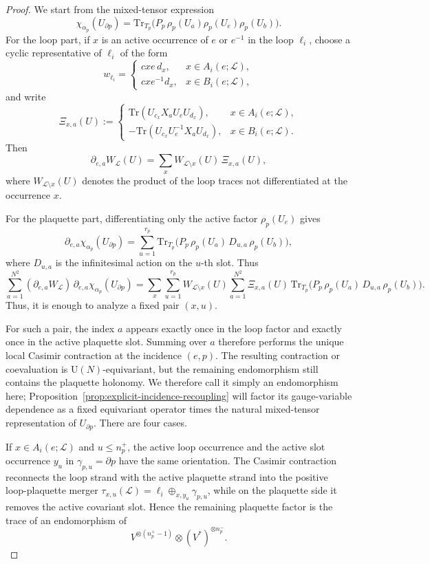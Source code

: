 \documentclass[11pt,a4paper,reqno]{article}
\theoremstyle{definition}
\theoremstyle{remark}
\newcommand\U{{\mathrm U}}
\newcommand\Lc{{\mathcal{L}}}
\begin{document}
\begin{proof}
We start from the mixed-tensor expression
\[
\chi_{\alpha_p}(U_{\partial p})=\mathrm{Tr}_{T_p}\!\bigl(P_p\,\rho_p(U_a)\rho_p(U_e)\rho_p(U_b)\bigr).
\]
For the loop part, if $x$ is an active occurrence of $e$ or $e^{-1}$ in the loop $\ell_i$, choose a cyclic representative of $\ell_i$ of the form
\[
w_{\ell_i}=
\begin{cases}
cxe\,d_x,& x\in A_i(e;\Lc),\\
cxe^{-1}d_x,& x\in B_i(e;\Lc),
\end{cases}
\]
and write
\[
\Xi_{x,a}(U):=
\begin{cases}
\mathrm{Tr}(U_{c_x}X_aU_eU_{d_x}),& x\in A_i(e;\Lc),\\
-\mathrm{Tr}(U_{c_x}U_e^{-1}X_aU_{d_x}),& x\in B_i(e;\Lc).
\end{cases}
\]
Then
\[
\partial_{e,a}W_{\Lc}(U)=\sum_x W_{\Lc\setminus x}(U)\,\Xi_{x,a}(U),
\]
where $W_{\Lc\setminus x}(U)$ denotes the product of the loop traces not differentiated at the occurrence $x$.

For the plaquette part, differentiating only the active factor $\rho_p(U_e)$ gives
\[
\partial_{e,a}\chi_{\alpha_p}(U_{\partial p})=\sum_{u=1}^{r_p}
\mathrm{Tr}_{T_p}\!\bigl(P_p\,\rho_p(U_a)\,D_{u,a}\,\rho_p(U_b)\bigr),
\]
where $D_{u,a}$ is the infinitesimal action on the $u$-th slot. Thus
\[
\sum_{a=1}^{N^2}(\partial_{e,a}W_{\Lc})\,\partial_{e,a}\chi_{\alpha_p}(U_{\partial p})=\sum_x\sum_{u=1}^{r_p}W_{\Lc\setminus x}(U)\sum_{a=1}^{N^2} \Xi_{x,a}(U)\,\mathrm{Tr}_{T_p}\!\bigl(P_p\,\rho_p(U_a)\,D_{u,a}\,\rho_p(U_b)\bigr).
\]
Thus, it is enough to analyze a fixed pair $(x,u)$.

For such a pair, the index $a$ appears exactly once in the loop factor and exactly once in the active plaquette slot. Summing over $a$ therefore performs the unique local Casimir contraction at the incidence $(e,p)$.  The resulting contraction or coevaluation is $\U(N)$-equivariant, but the remaining endomorphism still contains the plaquette holonomy.  We therefore call it simply an endomorphism here; Proposition~\ref{prop:explicit-incidence-recoupling} will factor its gauge-variable dependence as a fixed equivariant operator times the natural mixed-tensor representation of $U_{\partial p}$. There are four cases.

If $x\in A_i(e;\Lc)$ and $u\le n_p^+$, the active loop occurrence and the active slot occurrence $y_u$ in $\gamma_{p,u}=\partial p$ have the same orientation. The Casimir contraction reconnects the loop strand with the active plaquette strand into the positive loop-plaquette merger $\tau_{x,u}(\Lc)=\ell_i\oplus_{x,y_u}\gamma_{p,u}$, while on the plaquette side it removes the active covariant slot. Hence the remaining plaquette factor is the trace of an endomorphism of
\[
V^{\otimes(n_p^+-1)}\otimes (V^*)^{\otimes n_p^-}.
\]


\end{proof}
\end{document}
